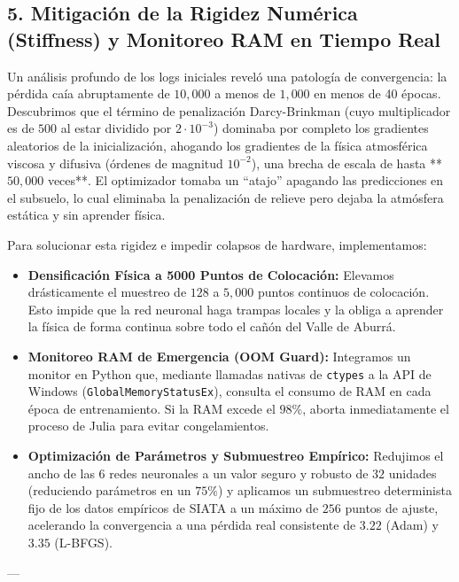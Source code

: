 \documentclass[11pt,a4paper]{article}
\begin{document}
\subsection{5. Mitigación de la Rigidez Numérica (Stiffness) y Monitoreo RAM en Tiempo Real}
Un análisis profundo de los logs iniciales reveló una patología de convergencia: la pérdida caía abruptamente de $10,000$ a menos de $1,000$ en menos de 40 épocas. Descubrimos que el término de penalización Darcy-Brinkman (cuyo multiplicador es de $500$ al estar dividido por $2 \cdot 10^{-3}$) dominaba por completo los gradientes aleatorios de la inicialización, ahogando los gradientes de la física atmosférica viscosa y difusiva (órdenes de magnitud $10^{-2}$), una brecha de escala de hasta **$50,000$ veces**. El optimizador tomaba un ``atajo'' apagando las predicciones en el subsuelo, lo cual eliminaba la penalización de relieve pero dejaba la atmósfera estática y sin aprender física.

Para solucionar esta rigidez e impedir colapsos de hardware, implementamos:
\begin{itemize}
    \item \textbf{Densificación Física a 5000 Puntos de Colocación:} Elevamos drásticamente el muestreo de $128$ a $5,000$ puntos continuos de colocación. Esto impide que la red neuronal haga trampas locales y la obliga a aprender la física de forma continua sobre todo el cañón del Valle de Aburrá.
    \item \textbf{Monitoreo RAM de Emergencia (OOM Guard):} Integramos un monitor en Python que, mediante llamadas nativas de \texttt{ctypes} a la API de Windows (\texttt{GlobalMemoryStatusEx}), consulta el consumo de RAM en cada época de entrenamiento. Si la RAM excede el $98\%$, aborta inmediatamente el proceso de Julia para evitar congelamientos.
    \item \textbf{Optimización de Parámetros y Submuestreo Empírico:} Redujimos el ancho de las 6 redes neuronales a un valor seguro y robusto de $32$ unidades (reduciendo parámetros en un $75\%$) y aplicamos un submuestreo determinista fijo de los datos empíricos de SIATA a un máximo de $256$ puntos de ajuste, acelerando la convergencia a una pérdida real consistente de $3.22$ (Adam) y $3.35$ (L-BFGS).
\end{itemize}

---
\end{document}

